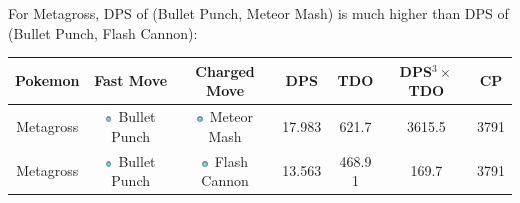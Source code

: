 \documentclass[8pt,aspectratio=169,compress]{beamer}
\newcommand{\psysimp}{\includegraphics[height=0.15cm]{../../images/type/simplified/psy.png}}
\newcommand{\steelsimp}{\includegraphics[height=0.15cm]{../../images/type/simplified/steel.png}}
\begin{document}
\begin{frame}
\begin{block}{}
\begin{tiny}
\begin{itemize}
For Metagross, DPS of (Bullet Punch, Meteor Mash) is much higher than DPS of (Bullet Punch, Flash Cannon):
\begin{center}
\begin{tabular}{ccccccc}
Pokemon & Fast Move & Charged Move & DPS & TDO & DPS$^3 \times$ TDO & CP \\ \hline
Metagross	 & \steelsimp~Bullet Punch	& \steelsimp~Meteor Mash&	17.983	&621.7	&3615.5	&3791\\
Metagross	& \steelsimp~Bullet Punch	& \steelsimp~Flash Cannon&	13.563	&468.9	1&169.7&	3791\\
\end{tabular}
\end{center}
\end{itemize}

\end{tiny}
\end{block}
\end{frame}
\end{document}
